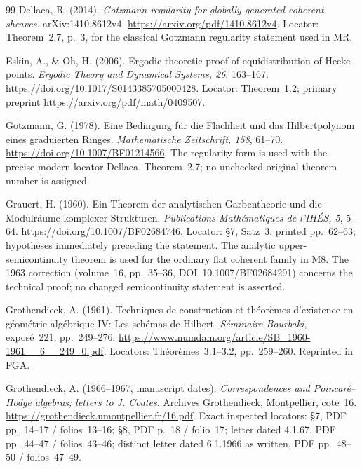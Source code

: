 \documentclass[11pt,a4paper]{article}
\theoremstyle{definition}\newtheorem{definition}[theorem]{Definition}
\theoremstyle{remark}\newtheorem{remark}[theorem]{Remark}
\begin{document}
\begin{thebibliography}{99}
Dellaca, R. (2014). \emph{Gotzmann regularity for globally generated coherent sheaves}. arXiv:1410.8612v4. \url{https://arxiv.org/pdf/1410.8612v4}. Locator: Theorem~2.7, p.~3, for the classical Gotzmann regularity statement used in MR.

Eskin, A., \& Oh, H. (2006). Ergodic theoretic proof of equidistribution of Hecke points. \emph{Ergodic Theory and Dynamical Systems, 26}, 163--167. \url{https://doi.org/10.1017/S0143385705000428}. Locator: Theorem~1.2; primary preprint \url{https://arxiv.org/pdf/math/0409507}.

Gotzmann, G. (1978). Eine Bedingung f\"ur die Flachheit und das Hilbertpolynom eines graduierten Ringes. \emph{Mathematische Zeitschrift, 158}, 61--70. \url{https://doi.org/10.1007/BF01214566}. The regularity form is used with the precise modern locator Dellaca, Theorem~2.7; no unchecked original theorem number is assigned.

Grauert, H. (1960). Ein Theorem der analytischen Garbentheorie und die Modulr\"aume komplexer Strukturen. \emph{Publications Math\'ematiques de l'IH\'ES, 5}, 5--64. \url{https://doi.org/10.1007/BF02684746}. Locator: \S7, Satz~3, printed pp.~62--63; hypotheses immediately preceding the statement. The analytic upper-semicontinuity theorem is used for the ordinary flat coherent family in M8. The 1963 correction (volume~16, pp.~35--36, DOI~10.1007/BF02684291) concerns the technical proof; no changed semicontinuity statement is asserted.

Grothendieck, A. (1961). Techniques de construction et th\'eor\`emes d'existence en g\'eom\'etrie alg\'ebrique IV: Les sch\'emas de Hilbert. \emph{S\'eminaire Bourbaki}, expos\'e~221, pp.~249--276. \url{https://www.numdam.org/article/SB_1960-1961__6__249_0.pdf}. Locators: Th\'eor\`emes~3.1--3.2, pp.~259--260. Reprinted in FGA.

Grothendieck, A. (1966--1967, manuscript dates). \emph{Correspondences and Poincar\'e--Hodge algebras; letters to J. Coates}. Archives Grothendieck, Montpellier, cote~16. \url{https://grothendieck.umontpellier.fr/16.pdf}. Exact inspected locators: \S7, PDF pp.~14--17 / folios~13--16; \S8, PDF p.~18 / folio~17; letter dated 4.1.67, PDF pp.~44--47 / folios~43--46; distinct letter dated 6.1.1966 as written, PDF pp.~48--50 / folios~47--49.


\end{thebibliography}
\end{document}
